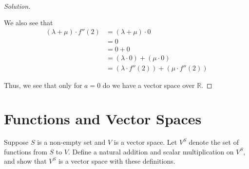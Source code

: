\documentclass{article}
\newenvironment{solution}{\begin{proof}[Solution]}{\end{proof}}
\newcommand{\RR}{\mathbb{R}}
\begin{document}
\begin{solution}
\begin{itemize}
		We also see that
		\begin{align*}
			(\lambda + \mu) \cdot f''(2) &= (\lambda + \mu) \cdot 0 \\
			&= 0 \\
			&= 0 + 0 \\
			&= (\lambda \cdot 0) + (\mu \cdot 0) \\
			&= (\lambda \cdot f''(2)) + (\mu \cdot f''(2))
		\end{align*}
	\end{itemize}

	Thus, we see that only for $a=0$ do we have a vector space over $\RR$. 
\end{solution}

\newpage

\section{Functions and Vector Spaces}
\begin{hw}
	Suppose $S$ is a non-empty set and $V$ is a vector space. Let $V^{S}$ denote the set of functions from $S$ to $V$. Define a natural addition and scalar multiplication on $V^{S}$, and show that $V^{S}$ is a vector space with these definitions.
\end{hw}
\end{document}

